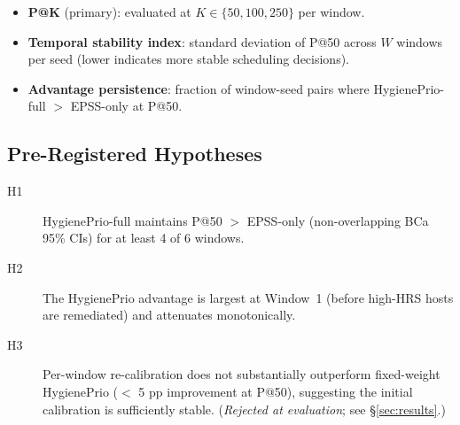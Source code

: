 \begin{itemize}
\item \textbf{P@K} (primary): evaluated at $K \in \{50, 100, 250\}$ per window.
\item \textbf{Temporal stability index}: standard deviation of P@50 across $W$ windows per seed (lower indicates more stable scheduling decisions).
\item \textbf{Advantage persistence}: fraction of window-seed pairs where HygienePrio-full $>$ EPSS-only at P@50.
\end{itemize}

\subsection{Pre-Registered Hypotheses}

\begin{description}
\item[H1] HygienePrio-full maintains P@50 $>$ EPSS-only (non-overlapping BCa 95\% CIs) for at least 4 of 6 windows.
\item[H2] The HygienePrio advantage is largest at Window~1 (before high-HRS hosts are remediated) and attenuates monotonically.
\item[H3] Per-window re-calibration does not substantially outperform fixed-weight HygienePrio ($<$ 5 pp improvement at P@50), suggesting the initial calibration is sufficiently stable. (\textit{Rejected at evaluation}; see \S\ref{sec:results}.)
\end{description}
